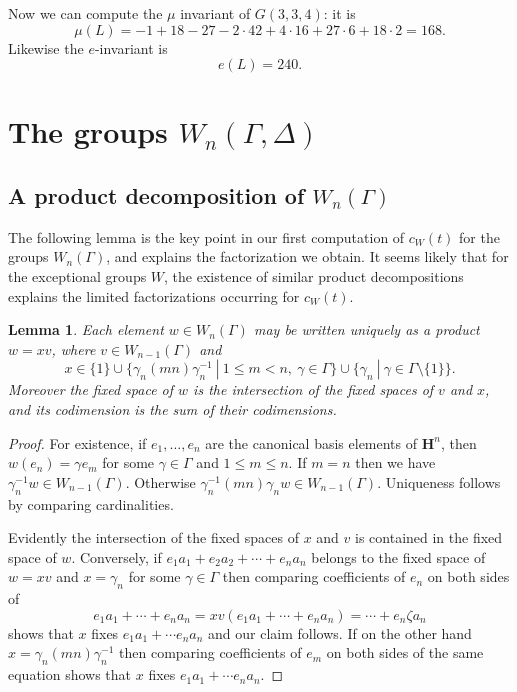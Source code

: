\documentclass[11pt, reqno]{amsart}
\numberwithin{equation}{section}
\theoremstyle{definition}
\theoremstyle{plain}
\newtheorem{lemma}[theorem]{Lemma}
\newcommand{\HH}{\mathbf{H}}
\begin{document}
Now we can compute the $\mu$ invariant of $G(3,3,4)$: it is $$\mu(L)=-1+18-27-2 \cdot 42+4 \cdot 16+27 \cdot 6+18 \cdot 2=168.$$ Likewise the $e$-invariant is $$e(L)=240.$$


\section{The groups $W_n(\Gamma,\Delta)$}

\subsection{A product decomposition of $W_n(\Gamma)$} \label{c product formula}
The following lemma is the key point in our first computation of $c_W(t)$ for the groups $W_n(\Gamma)$, and explains the factorization we obtain. It seems likely that for the exceptional groups $W$, the existence of similar product decompositions explains the limited factorizations occurring for $c_W(t)$. 

\begin{lemma}
Each element $w \in W_n(\Gamma)$ may be written uniquely as a product $w=x v$, where $v \in W_{n-1}(\Gamma)$ and 
$$x \in \{ 1 \} \cup \{ \gamma_n (mn) \gamma_n^{-1} \ | \ 1 \leq m < n, \ \gamma \in \Gamma \} \cup \{ \gamma_n \ | \ \gamma \in \Gamma \setminus \{1 \} \}.$$ Moreover the fixed space of $w$ is the intersection of the fixed spaces of $v$ and $x$, and its codimension is the sum of their codimensions.
\end{lemma}
\begin{proof}
For existence, if $e_1,\dots,e_n$ are the canonical basis elements of $\HH^n$, then $w(e_n)=\gamma e_m$ for some $\gamma \in \Gamma$ and $1 \leq m \leq n$. If $m=n$ then we have $\gamma_n^{-1} w \in W_{n-1}(\Gamma)$. Otherwise $\gamma_n^{-1} (mn) \gamma_n w \in W_{n-1}(\Gamma)$. Uniqueness follows by comparing cardinalities.

Evidently the intersection of the fixed spaces of $x$ and $v$ is contained in the fixed space of $w$. Conversely, if $e_1 a_1+e_2 a_2+\cdots+e_n a_n$ belongs to the fixed space of $w=xv$ and $x=\gamma_n$ for some $\gamma \in \Gamma$ then comparing coefficients of $e_n$ on both sides of $$e_1 a_1+\cdots+e_n a_n=xv(e_1a_1+\cdots+e_n a_n)=\cdots+e_n \zeta a_n$$ shows that $x$ fixes $e_1 a_1+\cdots e_n a_n$ and our claim follows. If on the other hand $x=\gamma_n (mn) \gamma_n^{-1}$ then comparing coefficients of $e_m$ on both sides of the same equation shows that $x$ fixes $e_1 a_1+\cdots e_n a_n$. 
\end{proof} 
\end{document}
